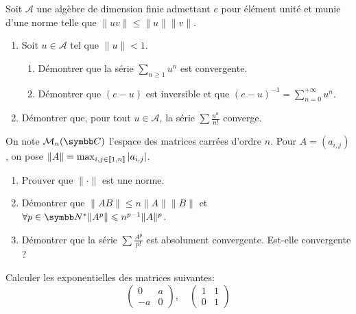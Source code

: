 \begin{exercice}
    Soit $\mathcal{A}$ une algèbre de dimension finie admettant $e$ pour élément unité et munie d'une norme telle que $\|uv\| \le \|u\|\|v\|$.
    \begin{enumerate}
        \item Soit $u \in \mathcal{A}$ tel que $\|u\| < 1$.
        \begin{enumerate}
            \item Démontrer que la série $\sum_{n\geqslant1} u^{n}$ est convergente.
            \item Démontrer que $(e-u)$ est inversible et que $\displaystyle (e-u)^{-1}=\sum_{n=0}^{+\infty}u^{n}$.
        \end{enumerate}
        \item Démontrer que, pour tout $u \in \mathcal{A}$, la série $\sum\frac{u^{n}}{n!}$ converge.
    \end{enumerate}
\end{exercice}

\begin{exercice}
    On note $\mathcal{M}_{n}(\C)$ l'espace des matrices carrées d'ordre $n$. Pour $A=(a_{i,j})$, on pose $\|A\| = \max_{i,j \in [\![1, n]\!]} |a_{i,j}|$.
    \begin{enumerate}
        \item Prouver que $\|\cdot\|$ est une norme.
        \item Démontrer que $\|AB\| \leqslant n\|A\|\|B\|$ et $\forall p \in \N^* \|A^p\| \leqslant n^{p-1}\|A\|^p$.
        \item Démontrer que la série $\sum\frac{A^{p}}{p!}$ est absolument convergente. Est-elle convergente ?
    \end{enumerate}
\end{exercice}

\begin{exercice}
    Calculer les exponentielles des matrices suivantes:
    \[\begin{pmatrix} 0 & a \\ -a & 0 \end{pmatrix}, \quad \begin{pmatrix} 1 & 1 \\ 0 & 1 \end{pmatrix}\]

\end{exercice}

